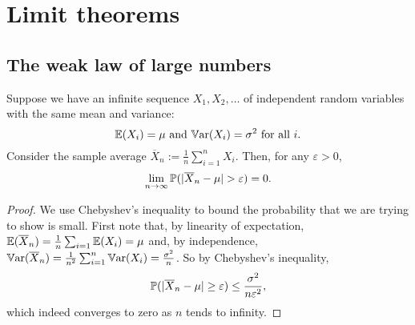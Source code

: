 \documentclass[10pt, a4paper]{article}
\begin{document}
\newpage

\section{Limit theorems}

\subsection{The weak law of large numbers}
\begin{theorem}
    Suppose we have an infinite sequence $X_1, X_2, \dotsc$ of independent random variables with the same mean and variance:
    \[
    \E(X_i) = \mu\text{ and }\Var(X_i) = \sigma ^ 2\text{ for all } i.
    \]
    Consider the sample average $\overline{X}_n := \frac{1}{n}\sum_{i = 1}^{n}X_i$.
    Then,
    for any $\varepsilon > 0$,
    \[
    \lim_{n \rightarrow \infty}\P(|\overline{X}_n - \mu| > \varepsilon) = 0.
    \]
    \begin{proof}
        We use Chebyshev's inequality to bound the probability that we are trying to show is small.
        First note that,
        by linearity of expectation,
        $\E(\overline{X}_n) = \frac{1}{n}\sum_{i = 1}\E(X_i) = \mu$ and,
        by independence,
        $\Var(\overline{X}_n) = \frac{1}{n ^ 2}\sum_{i = 1}^{n}\Var(X_i) = \frac{\sigma ^ 2}{n}$.
        So by Chebyshev's inequality,
        \[
        \P(|\overline{X}_n - \mu| \geq \varepsilon) \leq \frac{\sigma ^ 2}{n\varepsilon ^ 2},
        \]
        which indeed converges to zero as $n$ tends to infinity.
    \end{proof}
\end{theorem}
\end{document}
